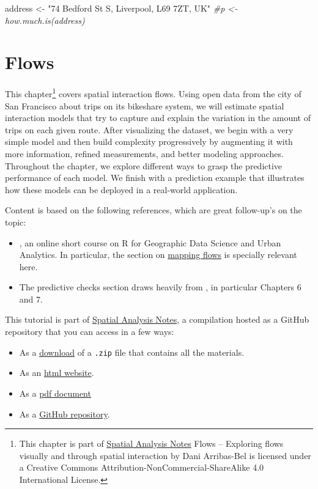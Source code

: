 \documentclass[
]{book}
\newenvironment{Shaded}{\begin{snugshade}}{\end{snugshade}}
\newcommand{\CommentTok}[1]{\textcolor[rgb]{0.56,0.35,0.01}{\textit{#1}}}
\newcommand{\NormalTok}[1]{#1}
\newcommand{\StringTok}[1]{\textcolor[rgb]{0.31,0.60,0.02}{#1}}
\providecommand{\tightlist}{%
  \setlength{\itemsep}{0pt}\setlength{\parskip}{0pt}}
\begin{document}
\begin{Shaded}
\begin{Highlighting}[]
\NormalTok{address <-}\StringTok{ "74 Bedford St S, Liverpool, L69 7ZT, UK"}
\CommentTok{#p <- how.much.is(address)}
\end{Highlighting}
\end{Shaded}

\hypertarget{flows}{%
\chapter{Flows}\label{flows}}

This chapter\footnote{This chapter is part of \href{index.html}{Spatial Analysis Notes} {Flows -- Exploring flows visually and through spatial interaction} by Dani Arribas-Bel is licensed under a Creative Commons Attribution-NonCommercial-ShareAlike 4.0 International License.} covers spatial interaction flows. Using open data from the city of San Francisco about trips on its bikeshare system, we will estimate spatial interaction models that try to capture and explain the variation in the amount of trips on each given route. After visualizing the dataset, we begin with a very simple model and then build complexity progressively by augmenting it with more information, refined measurements, and better modeling approaches. Throughout the chapter, we explore different ways to grasp the predictive performance of each model. We finish with a prediction example that illustrates how these models can be deployed in a real-world application.

Content is based on the following references, which are great follow-up's on the topic:

\begin{itemize}
\tightlist
\item
  \citet{gds_ua17}, an online short course on R for Geographic Data Science and Urban Analytics. In particular, the section on \href{https://github.com/alexsingleton/GDS_UA_2017/tree/master/Mapping_Flows}{mapping flows} is specially relevant here.
\item
  The predictive checks section draws heavily from \citet{gelman2006data}, in particular Chapters 6 and 7.
\end{itemize}

This tutorial is part of \href{index.html}{Spatial Analysis Notes}, a compilation hosted as a GitHub repository that you can access in a few ways:

\begin{itemize}
\tightlist
\item
  As a \href{https://github.com/GDSL-UL/san/archive/master.zip}{download} of a \texttt{.zip} file that contains all the materials.
\item
  As an \href{https://gdsl-ul.github.io/san/flows.html}{html
  website}.
\item
  As a \href{https://gdsl-ul.github.io/san/spatial_analysis_notes.pdf}{pdf
  document}
\item
  As a \href{https://github.com/GDSL-UL/san}{GitHub repository}.
\end{itemize}
\end{document}

